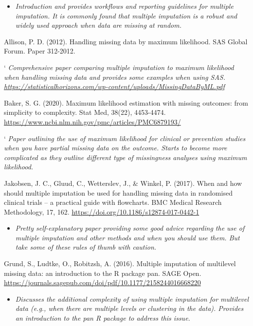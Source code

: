 \documentclass[
]{book}
\providecommand{\tightlist}{%
  \setlength{\itemsep}{0pt}\setlength{\parskip}{0pt}}
\begin{document}
\begin{itemize}
\tightlist
\item
  \emph{Introduction and provides workflows and reporting guidelines for multiple imputation. It is commonly found that multiple imputation is a robust and widely used approach when data are missing at random.}
\end{itemize}

Allison, P. D. (2012). Handling missing data by maximum likelihood. SAS Global Forum. Paper 312-2012.

` \emph{Comprehensive paper comparing multiple imputation to maximum likelihood when handling missing data and provides some examples when using SAS. \url{https://statisticalhorizons.com/wp-content/uploads/MissingDataByML.pdf} }

Baker, S. G. (2020). Maximum likelihood estimation with missing outcomes: from simplicity to complexity. Stat Med, 38(22), 4453-4474. \url{https://www.ncbi.nlm.nih.gov/pmc/articles/PMC6879193/}

` \emph{Paper outlining the use of maximum likelihood for clinical or prevention studies when you have partial missing data on the outcome. Starts to become more complicated as they outline different type of missingness analyses using maximum likelihood. }

Jakobsen, J. C., Gluud, C., Wetterslev, J., \& Winkel, P. (2017). When and how should multiple imputation be used for handling missing data in randomised clinical trials -- a practical guide with flowcharts. BMC Medical Research Methodology, 17, 162. \url{https://doi.org/10.1186/s12874-017-0442-1}

\begin{itemize}
\tightlist
\item
  \emph{Pretty self-explanatory paper providing some good advice regarding the use of multiple imputation and other methods and when you should use them. But take some of these rules of thumb with caution. }
\end{itemize}

Grund, S., Ludtke, O., Robitzsh, A. (2016). Multiple imputation of multilevel missing data: an introduction to the R package pan. SAGE Open. \url{https://journals.sagepub.com/doi/pdf/10.1177/2158244016668220}

\begin{itemize}
\tightlist
\item
  \emph{Discusses the additional complexity of using multiple imputation for multilevel data (e.g., when there are multiple levels or clustering in the data). Provides an introduction to the pan R package to address this issue. }
\end{itemize}
\end{document}
